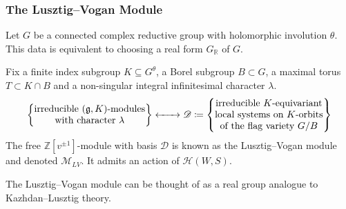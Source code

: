 \documentclass{beamer}
\begin{document}
\begin{frame}
\frametitle{The Lusztig--Vogan Module}
\noindent Let $G$ be a connected complex reductive group with holomorphic involution $\theta$. This data is equivalent to choosing a real form $G_\mathbb{R}$ of $G$.\newline

\noindent Fix a finite index subgroup $K \subseteq G^\theta$, a Borel subgroup $B \subset G$, a maximal torus $T \subset K \cap B$ and a non-singular integral infinitesimal character $\lambda$.
\begin{align*}
\begin{split}
\left\{\begin{matrix}\text{irreducible $(\mathfrak{g}, K)$-modules}\\\text{with character $\lambda$}\end{matrix}\right\} \xleftrightarrow{\qquad} \mathscr{D} \coloneqq \left\{\begin{matrix}\text{irreducible $K$-equivariant}\\\text{local systems on $K$-orbits}\\\text{of the flag variety $G/B$}\end{matrix}\right\}
\end{split}
\end{align*}
\noindent The free $\mathbb{Z}[v^{\pm 1}]$-module with basis $\mathscr{D}$ is known as the \textcolor{structure}{Lusztig--Vogan module} and denoted $\mathcal{M}_{LV}$. It admits an action of $\mathscr{H}(W, S)$.\newline

\noindent The Lusztig--Vogan module can be thought of as a \textcolor{structure}{real group analogue to Kazhdan--Lusztig theory}.\newline
\end{frame}
\end{document}
